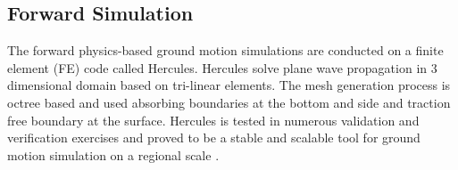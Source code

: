 \subsection{Forward Simulation}

The forward physics-based ground motion simulations are conducted on a finite element (FE) code called Hercules. Hercules solve plane wave propagation in 3 dimensional domain based on tri-linear elements. The mesh generation process is octree based and used absorbing boundaries at the bottom and side and traction free boundary at the surface. Hercules is tested in numerous validation and verification exercises and proved to be a stable and scalable tool for ground motion simulation on a regional scale \citep[e.g., see ][]{bielak2010shakeout}. 